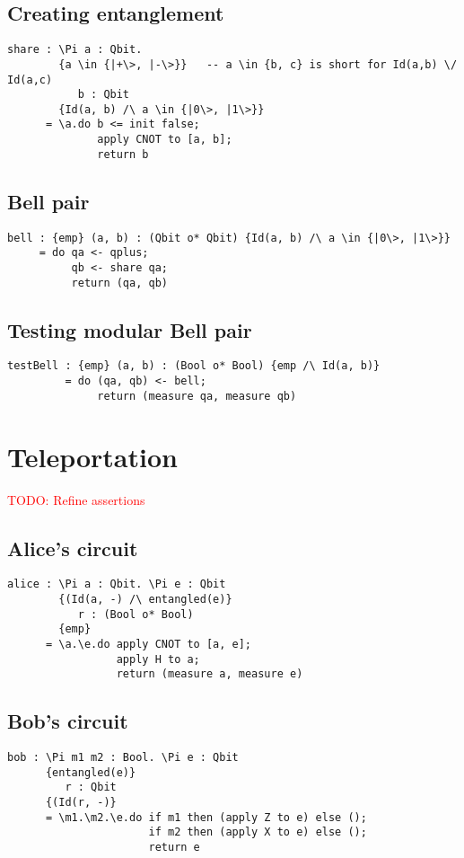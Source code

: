 \documentclass[acmsmall,nonacm,timestamp,review=false,anonymous=false]{acmart}
\newcommand{\todo}[1]{\textcolor{red}{#1}}
\begin{document}
\subsection{Creating entanglement}
\begin{lstlisting}[language=QHaskell]
share : \Pi a : Qbit.
        {a \in {|+\>, |-\>}}   -- a \in {b, c} is short for Id(a,b) \/ Id(a,c)
           b : Qbit
        {Id(a, b) /\ a \in {|0\>, |1\>}}
      = \a.do b <= init false;
              apply CNOT to [a, b];
              return b
\end{lstlisting}

\subsection{Bell pair}
\begin{lstlisting}[language=QHaskell]
bell : {emp} (a, b) : (Qbit o* Qbit) {Id(a, b) /\ a \in {|0\>, |1\>}}
     = do qa <- qplus;
          qb <- share qa;
          return (qa, qb)
\end{lstlisting}

\subsection{Testing modular Bell pair}
\begin{lstlisting}[language=QHaskell]
testBell : {emp} (a, b) : (Bool o* Bool) {emp /\ Id(a, b)}
         = do (qa, qb) <- bell;
              return (measure qa, measure qb)
\end{lstlisting}

\section{Teleportation}
\label{app:teleport}
\todo{TODO: Refine assertions}
\subsection{Alice's circuit}
\begin{lstlisting}[language=QHaskell]
alice : \Pi a : Qbit. \Pi e : Qbit
        {(Id(a, -) /\ entangled(e)}
           r : (Bool o* Bool)
        {emp}
      = \a.\e.do apply CNOT to [a, e];
                 apply H to a;
                 return (measure a, measure e)
\end{lstlisting}

\subsection{Bob's circuit}
\begin{lstlisting}[language=QHaskell]
bob : \Pi m1 m2 : Bool. \Pi e : Qbit
      {entangled(e)}
         r : Qbit
      {(Id(r, -)}
      = \m1.\m2.\e.do if m1 then (apply Z to e) else ();
                      if m2 then (apply X to e) else ();
                      return e
\end{lstlisting}
\end{document}
